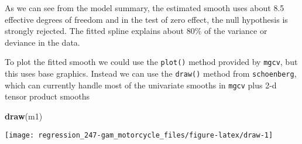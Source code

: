 \documentclass[]{book}
\newenvironment{Shaded}{\begin{snugshade}}{\end{snugshade}}
\newcommand{\CommentTok}[1]{\textcolor[rgb]{0.56,0.35,0.01}{\textit{#1}}}
\newcommand{\DataTypeTok}[1]{\textcolor[rgb]{0.13,0.29,0.53}{#1}}
\newcommand{\KeywordTok}[1]{\textcolor[rgb]{0.13,0.29,0.53}{\textbf{#1}}}
\newcommand{\NormalTok}[1]{#1}
\newcommand{\OperatorTok}[1]{\textcolor[rgb]{0.81,0.36,0.00}{\textbf{#1}}}
\newcommand{\StringTok}[1]{\textcolor[rgb]{0.31,0.60,0.02}{#1}}
\begin{document}
\begin{Shaded}
\end{Shaded}

As we can see from the model summary, the estimated smooth uses about 8.5 effective degrees of freedom and in the test of zero effect, the null hypothesis is strongly rejected. The fitted spline explains about 80\% of the variance or deviance in the data.

To plot the fitted smooth we could use the \texttt{plot()} method provided by \texttt{mgcv}, but this uses base graphics. Instead we can use the \texttt{draw()} method from \texttt{schoenberg}, which can currently handle most of the univariate smooths in \texttt{mgcv} plus 2-d tensor product smooths

\begin{Shaded}
\begin{Highlighting}[]
\KeywordTok{draw}\NormalTok{(m1)}
\end{Highlighting}
\end{Shaded}

\begin{center}\texttt{[image: regression\_247-gam\_motorcycle\_files/figure-latex/draw-1]} \end{center}
\end{document}
